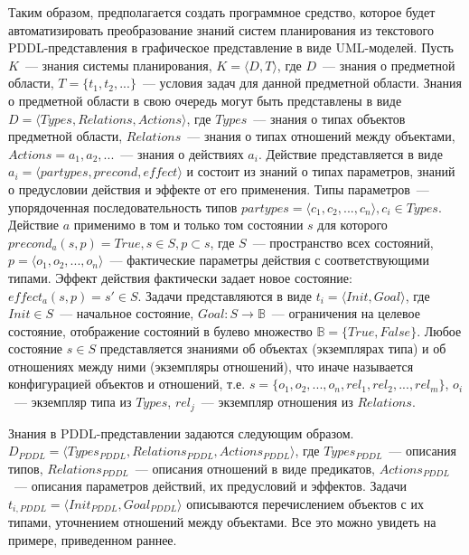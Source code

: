 \documentclass[a4paper,14pt]{extreport}
\begin{document}
    Таким образом, предполагается создать программное средство, которое будет автоматизировать преобразование знаний систем планирования из текстового PDDL-представления в графическое представление в виде UML-моделей. Пусть $K$~--- знания системы планирования, $K = \langle D, T \rangle$, где $D$~--- знания о предметной области, $T = \{t_1, t_2, ...\}$~--- условия задач для данной предметной области. Знания о предметной области в свою очередь могут быть представлены в виде $D = \langle Types, Relations, Actions \rangle$, где $Types$~--- знания о типах объектов предметной области, $Relations$~--- знания о типах отношений между объектами, $Actions = {a_1, a_2, ...}$~--- знания о действиях $a_i$. Действие представляется в виде $a_i = \langle partypes, precond, effect \rangle$ и состоит из знаний о типах параметров, знаний о предусловии действия и эффекте от его применения. Типы параметров~--- упорядоченная последовательность типов $ partypes = \langle c_1, c_2, ..., c_n \rangle, c_i \in Types$. Действие $a$ применимо в том и только том состоянии $s$ для которого $precond_a(s,p) = True, s \in S, p \subset s$, где $S$~--- пространство всех состояний, $p = \langle o_1, o_2, ..., o_n \rangle$~--- фактические параметры действия с соответствующими типами. Эффект действия фактически задает новое состояние: $effect_a(s, p) = s' \in S$. Задачи представляются в виде $t_i = \langle Init, Goal \rangle$, где $Init \in S$~--- начальное состояние, $Goal: S \rightarrow \mathbb{B}$~--- ограничения на целевое состояние, отображение состояний в булево множество $\mathbb{B} = \{ True, False\}$. Любое состояние $s \in S$ представляется знаниями об объектах (экземплярах типа) и об отношениях между ними (экземпляры отношений), что иначе называется конфигурацией объектов и отношений, т.е. $s = \{o_1, o_2, ..., o_n, rel_1, rel_2, ..., rel_m\}$, $o_i$~--- экземпляр типа из $Types$, $rel_j$~--- экземпляр отношения из $Relations$.
    
    Знания в PDDL-представлении задаются следующим образом. $D_{PDDL} = \langle Types_{PDDL}, Relations_{PDDL}, Actions_{PDDL} \rangle$, где $Types_{PDDL}$~--- описания типов, $Relations_{PDDL}$~--- описания отношений в виде предикатов, $Actions_{PDDL}$~--- описания параметров действий, их предусловий и эффектов. Задачи  $t_{i, PDDL} = \langle Init_{PDDL}, Goal_{PDDL} \rangle$ описываются перечислением объектов с их типами, уточнением отношений между объектами.   Все это можно увидеть на примере, приведенном раннее.
    
\end{document}
